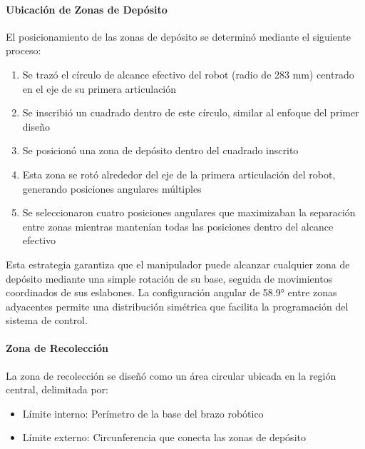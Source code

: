 \paragraph{Ubicación de Zonas de Depósito}

El posicionamiento de las zonas de depósito se determinó mediante el siguiente proceso:

\begin{enumerate}
    \item Se trazó el círculo de alcance efectivo del robot (radio de 283 mm) centrado en el eje de su primera articulación
    
    \item Se inscribió un cuadrado dentro de este círculo, similar al enfoque del primer diseño
    
    \item Se posicionó una zona de depósito dentro del cuadrado inscrito
    
    \item Esta zona se rotó alrededor del eje de la primera articulación del robot, generando posiciones angulares múltiples
    
    \item Se seleccionaron cuatro posiciones angulares que maximizaban la separación entre zonas mientras mantenían todas las posiciones dentro del alcance efectivo
\end{enumerate}

Esta estrategia garantiza que el manipulador puede alcanzar cualquier zona de depósito mediante una simple rotación de su base, seguida de movimientos coordinados de sus eslabones. La configuración angular de 58.9° entre zonas adyacentes permite una distribución simétrica que facilita la programación del sistema de control.

\paragraph{Zona de Recolección}

La zona de recolección se diseñó como un área circular ubicada en la región central, delimitada por:

\begin{itemize}
    \item Límite interno: Perímetro de la base del brazo robótico
    \item Límite externo: Circunferencia que conecta las zonas de depósito
\end{itemize}

